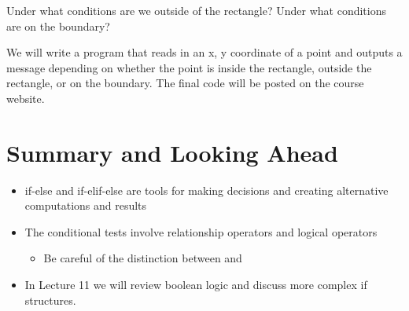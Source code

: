 \documentclass[letterpaper,10pt,english]{sphinxmanual}
\begin{document}
Under what conditions are we outside of the rectangle? Under what
conditions are on the boundary?

We will write a program that reads in an x, y coordinate of a point
and outputs a message depending on whether the point is inside the
rectangle, outside the rectangle, or on the boundary.  The final code
will be posted on the course website.


\section{Summary and Looking Ahead}
\label{\detokenize{lecture_notes/lec06_conditionals1:summary-and-looking-ahead}}\begin{itemize}
\item {} 
if-else and if-elif-else are tools for making decisions and creating
alternative computations and results

\item {} 
The conditional tests involve relationship operators and logical
operators
\begin{itemize}
\item {} 
Be careful of the distinction between \sphinxcode{\sphinxupquote{=}} and \sphinxcode{\sphinxupquote{==}}

\end{itemize}

\item {} 
In Lecture 11 we will review boolean logic and discuss more complex if
structures.

\end{itemize}
\end{document}
